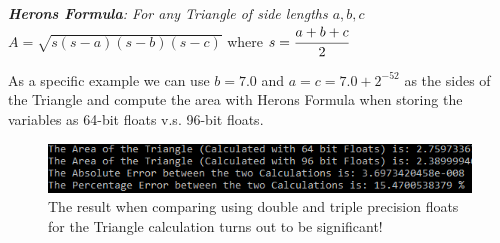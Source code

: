 \documentclass[twocolumn]{IEEEtran}
\begin{document}
\begin{theorem}
\textit{\textbf{Herons Formula}: For any Triangle of side lengths $a, b, c$ }
\break
$A = \sqrt{s(s-a)(s-b)(s-c)}$ where $s = \cfrac{a + b + c}{2}$
\break
\end{theorem}

As a specific example we can use $b = 7.0$ and \break
$a = c = {7.0 + 2^{-52}}$ as the sides of the Triangle and compute the area with Herons Formula when storing the variables as 64-bit floats v.s. 96-bit floats.

\begin{figure}[h]

\begin{center}

\includegraphics[scale=0.7]{Single_Triangle}
\caption{The result when comparing using double and triple precision floats for the Triangle calculation turns out to be significant!}

\end{center}

\end{figure}
\end{document}
